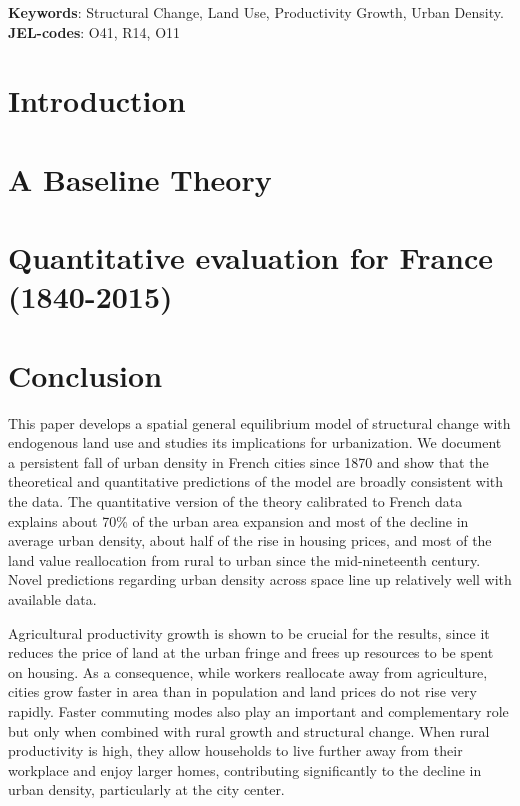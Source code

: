 \documentclass[11pt]{article}
\begin{document}
\textbf{Keywords}: Structural Change, Land Use, Productivity Growth, Urban Density.\\
\textbf{JEL-codes}: O41, R14, O11

\vfill

\pagebreak

\section{Introduction}


\section{A Baseline Theory}
\label{sec:baselinemodel}



\section{Quantitative evaluation for France (1840-2015)}\label{sec:QM} 



\section{Conclusion}\label{sec:conclusion}

This paper develops a spatial general equilibrium model of structural change with endogenous land use and studies its implications for urbanization. We document a persistent fall of urban density in French cities since 1870 and show that the theoretical and quantitative predictions of the model are broadly consistent with the data. The quantitative version of the theory calibrated to French data explains about 70\% of the urban area expansion and most of the decline in average urban density, about half of the rise in housing prices, and most of the land value reallocation from rural to urban since the mid-nineteenth century. Novel predictions regarding urban density across space line up relatively well with available data.

Agricultural productivity growth is shown to be crucial for the results, since it reduces the price of land at the urban fringe and frees up resources to be spent on housing. As a consequence, while workers reallocate away from agriculture, cities grow faster in area than in population and land prices do not rise very rapidly. Faster commuting modes also play an important and complementary role but only when combined with rural growth and structural change. When rural productivity is high, they allow households to live further away from their workplace and enjoy larger homes, contributing significantly to the decline in urban density, particularly at the city center. 
\end{document}

